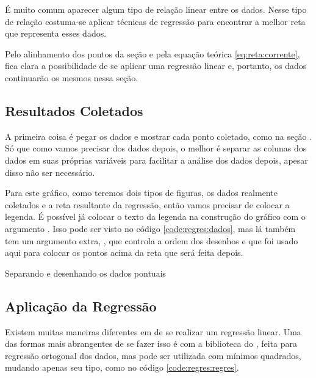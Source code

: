 É muito comum aparecer algum tipo de relação linear entre os dados. Nesse tipo de relação costuma-se aplicar técnicas de regressão para encontrar a melhor reta que representa esses dados.

Pelo alinhamento dos pontos da seção  e pela equação teórica \ref{eq:reta:corrente}, fica clara a possibilidade de se aplicar uma regressão linear e, portanto, os dados continuarão os mesmos nessa seção.


\subsection{Resultados Coletados}

    A primeira coisa é pegar os dados e mostrar cada ponto coletado, como na seção . Só que como vamos precisar dos dados depois, o melhor é separar as colunas dos dados em suas próprias variáveis para facilitar a análise dos dados depois, apesar disso não ser necessário.

    Para este gráfico, como teremos dois tipos de figuras, os dados realmente coletados e a reta resultante da regressão, então vamos precisar de colocar a legenda. É possível já colocar o texto da legenda na construção do gráfico com o argumento . Isso pode ser visto no código \ref{code:regres:dados}, mas lá também tem um argumento extra, , que controla a ordem dos desenhos e que foi usado aqui para colocar os pontos acima da reta que será feita depois.

    \begin{listing}[H]
        \caption{Separando e desenhando os dados pontuais}
        \label{code:regres:dados}

    \end{listing}


\subsection{Aplicação da Regressão}

    Existem muitas maneiras diferentes em \software de se realizar um regressão linear. Uma das formas mais abrangentes de se fazer isso é com a biblioteca \href{https://docs.scipy.org/doc/scipy/reference/odr.html}{} do \scipy, feita para regressão ortogonal dos dados, mas pode ser utilizada com mínimos quadrados, mudando apenas seu tipo, como no código \ref{code:regres:regres}.

